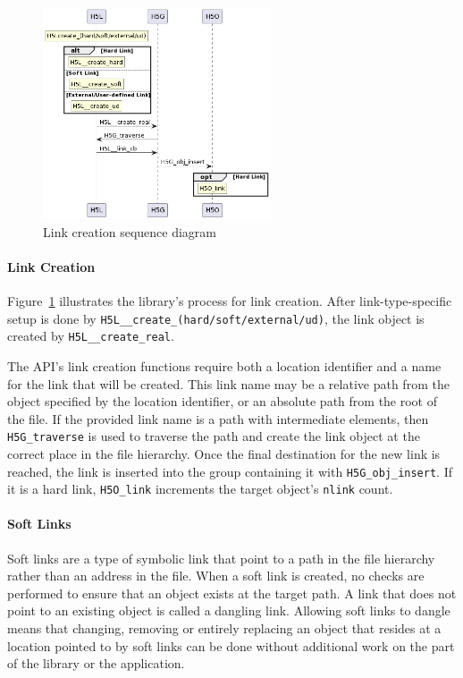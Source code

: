 \begin{figure}
    \centering
    \includegraphics[width=0.6\textwidth]{images/tour_4_uml_link_create.png}
    \caption{Link creation sequence diagram}
    \label{fig:tour-4-uml-link-create}
\end{figure}

\paragraph{Link Creation} Figure~\ref{fig:tour-4-uml-link-create} illustrates the library's process for link creation. After link-type-specific setup is done by \texttt{H5L\_\_create\_(hard/soft/external/ud)}, the link object is created by \texttt{H5L\_\_create\_real}.

The API's link creation functions require both a location identifier and a name for the link that will be created. This link name may be a relative path from the object specified by the location identifier, or an absolute path from the root of the file. If the provided link name is a path with intermediate elements, then \texttt{H5G\_traverse} is used to traverse the path and create the link object at the correct place in the file hierarchy. Once the final destination for the new link is reached, the link is inserted into the group containing it with \texttt{H5G\_obj\_insert}. If it is a hard link, \texttt{H5O\_link} increments the target object's \texttt{nlink} count. 

\paragraph{Soft Links} Soft links are a type of symbolic link that point to a path in the file hierarchy rather than an address in the file. When a soft link is created, no checks are performed to ensure that an object exists at the target path. A link that does not point to an existing object is called a dangling link. Allowing soft links to dangle means that changing, removing or entirely replacing an object that resides at a location pointed to by soft links can be done without additional work on the part of the library or the application.

